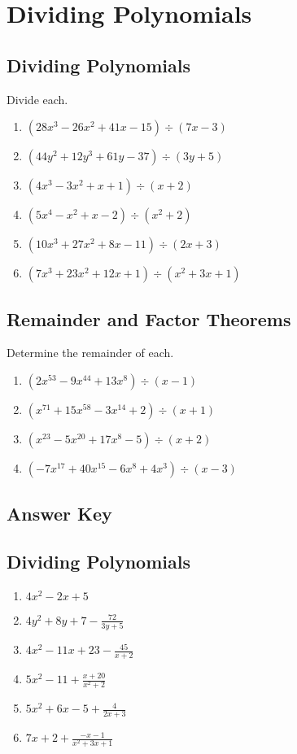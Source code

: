 \chapter{Dividing Polynomials}

\section{Dividing Polynomials}

Divide each.
\begin{enumerate}
    \item $(28x^3-26x^2+41x-15) \div (7x-3)$
    \item $(44y^2+12y^3+61y-37) \div (3y+5)$
    \item $\left(4x^3 - 3x^2 + x + 1\right) \div (x + 2)$
    \item $\left(5x^4 - x^2 + x - 2\right) \div (x^2 + 2)$
    \item $\left(10x^3 + 27x^2 + 8x - 11\right) \div (2x+3)$
	\item $\left(7x^3 + 23x^2 + 12x + 1\right) \div \left(x^2+3x+1\right)$
\end{enumerate}

\section{Remainder and Factor Theorems}

Determine the remainder of each.
\begin{enumerate}
	\item $\left(2x^{53} - 9x^{44} + 13x^8\right) \div (x - 1)$
	\item $\left(x^{71} + 15x^{58} - 3x^{14} + 2\right) \div (x + 1)$
	\item $\left(x^{23}-5x^{20}+17x^8-5\right) \div (x+2)$
	\item $\left(-7x^{17} + 40x^{15} - 6x^8 + 4x^3\right) \div (x-3)$
\end{enumerate}

\newpage

\section{Answer Key}

\section*{Dividing Polynomials}

\begin{enumerate}
    \item $4x^2-2x+5$
    \item $4y^2+8y+7-\frac{72}{3y+5}$
    \item $4x^2 - 11x + 23 - \frac{45}{x+2}$
    \item $5x^2 - 11 + \frac{x+20}{x^2+2}$
    \item $5x^2 + 6x - 5 + \frac{4}{2x+3}$
    \item $7x + 2 + \frac{-x-1}{x^2+3x+1}$
\end{enumerate}

